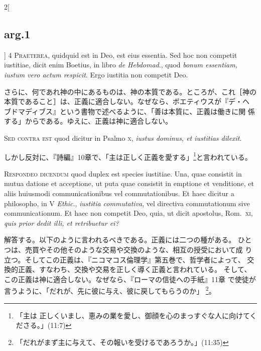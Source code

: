 \documentclass[paper=a4paper,fontsize=10pt,jafontsize=9pt,titlepage]{jlreq}
\begin{document}
\begin{paracol}{2}[\subsection{arg.1}]
{\scshape 4 Praeterea}, quidquid est in Deo, est eius
essentia. Sed hoc non competit iustitiae, dicit enim Boetius, in libro
{\itshape de Hebdomad}., quod {\itshape bonum essentiam, iustum vero actum respicit}. Ergo
iustitia non competit Deo.

\switchcolumn

さらに、何であれ神の中にあるものは、神の本質である。ところが、これ［神の
 本質であること］は、正義に適合しない。なぜなら、ボエティウスが『デ・ヘ
 ブドマディブス』という書物で述べるように、「善は本質に、正義は働きに関
 係する」からである。ゆえに、正義は神に適合しない。

\switchcolumn*[\subsection{s.c.}]

{\scshape Sed contra est} quod dicitur in Psalmo {\scshape x},
{\itshape iustus dominus, et iustitias dilexit}.

\switchcolumn

しかし反対に、『詩編』10章で、「主は正しく正義を愛する」\footnote{「主は
 正しくいまし、恵みの業を愛し、御顔を心のまっすぐな人に向けてくださる。」(11:7)}と言われている。


{\scshape Respondeo dicendum} quod duplex est species
iustitiae. Una, quae consistit in mutua datione et acceptione, ut puta
quae consistit in emptione et venditione, et aliis huiusmodi
communicationibus vel commutationibus. Et haec dicitur a philosopho, in
V {\itshape Ethic}., {\itshape iustitia commutativa}, vel directiva commutationum sive
communicationum. Et haec non competit Deo, quia, ut dicit apostolus,
Rom.~{\scshape xi}, {\itshape quis prior dedit illi, et retribuetur ei?}

\switchcolumn

解答する。以下のように言われるべきである。正義には二つの種がある。
ひとつは、売買やその他そのような交易や交換のような、相互の授受において成
 り立つ。そしてこの正義は、『ニコマコス倫理学』第五巻で、哲学者によって、
 交換的正義、すなわち、交換や交易を正しく導く正義と言われている。
そして、この正義は神に適合しない。なぜなら、『ローマの信徒への手紙』11章
 で使徒が言うように、「だれが、先に彼に与え、彼に戻してもらうのか」
 \footnote{「だれがまず主に与えて、その報いを受けるであろうか。」(11:35)}。


\end{paracol}
\end{document}
